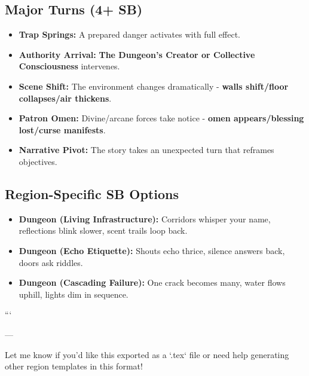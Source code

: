 \subsection*{Major Turns (4+ SB)}
\begin{itemize}
\item \textbf{Trap Springs:} A prepared danger activates with full effect.
\item \textbf{Authority Arrival:} \textbf{The Dungeon's Creator or Collective Consciousness} intervenes.
\item \textbf{Scene Shift:} The environment changes dramatically - \textbf{walls shift/floor collapses/air thickens}.
\item \textbf{Patron Omen:} Divine/arcane forces take notice - \textbf{omen appears/blessing lost/curse manifests}.
\item \textbf{Narrative Pivot:} The story takes an unexpected turn that reframes objectives.
\end{itemize}

\subsection*{Region-Specific SB Options}
\begin{itemize}
\item \textbf{Dungeon (Living Infrastructure):} Corridors whisper your name, reflections blink slower, scent trails loop back.
\item \textbf{Dungeon (Echo Etiquette):} Shouts echo thrice, silence answers back, doors ask riddles.
\item \textbf{Dungeon (Cascading Failure):} One crack becomes many, water flows uphill, lights dim in sequence.
\end{itemize}
```

---

Let me know if you'd like this exported as a `.tex` file or need help generating other region templates in this format!